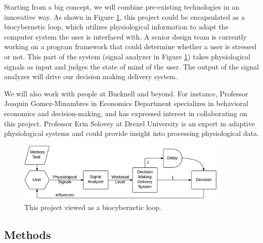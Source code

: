 \documentclass[12pt]{article}
\begin{document}
Starting from a big concept, we will combine pre-existing technologies in an innovative way. As shown in Figure \ref{figure:mindmap}, this project could be encapsulated as a biocybernetic loop, which utilizes physiological information to adapt the computer system the user is interfaced with. A senior design team is currently working on a program framework that could determine whether a user is stressed or not. This part of the system (signal analyzer in Figure \ref{figure:mindmap}) takes physiological signals as input and judges the state of mind of the user. The output of the signal analyzer will drive our decision making delivery system.

We will also work with people at Bucknell and beyond. For instance, Professor Joaquin Gomez-Minambres in Economics Department specializes in behavioral economics and decision-making, and has expressed interest in collaborating on this project. Professor Erin Solovey at Drexel University is an expert in adaptive physiological systems and could provide insight into processing physiological data.

\begin{figure}[h]
\centering
\includegraphics[width=0.9\textwidth]{hci_mindmap.pdf}
\caption{This project viewed as a biocybernetic loop.}
\label{figure:mindmap}
\end{figure}




\subsection{Methods}\label{methods}
\end{document}
